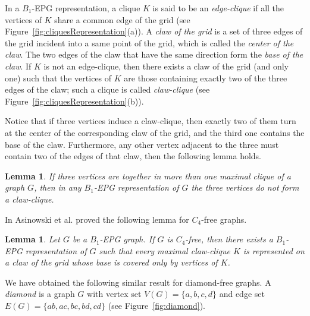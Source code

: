 \documentclass[9pt]{entcs}
\newtheorem{lema}[thm]{Lemma}%
\begin{document}
In  a $B_1$-EPG representation, a clique $K$  is said to be
 an \textit{edge-clique} if all the vertices of $K$ share a common edge of the grid (see Figure~\ref{fig:cliquesRepresentation}(a)).
 A \textit{claw of the grid} is a set of three edges of the grid incident into a same point of the grid, which is called
  the \textit{center of the claw}. The two edges of the claw that have the same direction form
    the \textit{ base of the claw}. If $K$ is not an edge-clique, then there exists
    a claw of the grid (and only one) such that the vertices of $K$ are those containing exactly two of the three edges of the claw; such a  clique is called  \textit{claw-clique} \cite{golumbic2009} (see Figure~\ref{fig:cliquesRepresentation}(b)).

    
    

Notice that if three vertices induce a claw-clique, then exactly two of them turn at the center of the corresponding  claw of the grid, and the third one contains the
base of the claw. 
Furthermore, any other vertex  adjacent to the three  must contain two of the edges of that claw, then the following lemma holds.

\begin{lema}\label{lem:cliquesMaximais}
If three vertices are together  in more than one maximal clique of a graph $G$, then in
any $B_1$-EPG representation of $G$ the three vertices do not form a claw-clique. %
\end{lema}



In \cite{ries2009} Asinowski et al. proved the following lemma for $C_4$-free graphs.

\begin{lema} \cite{ries2009} \label{lem:lemaBRies2009}
Let $G$ be a $B_1$-EPG graph. If $G$ is $C_4$-free, then there exists a $B_1$-EPG representation of $G$ such that every  maximal claw-clique $K$ is represented on a claw of the grid whose base is covered only by vertices of $K$.
\end{lema}


We have obtained the following similar result for diamond-free graphs. A \textit{diamond} is a graph $G$ with vertex set $V(G) = \{a, b, c, d\}$ and edge set $E(G)=\{ab, ac,bc, bd,cd\}$ (see Figure~\ref{fig:diamond}). %


\end{document}
